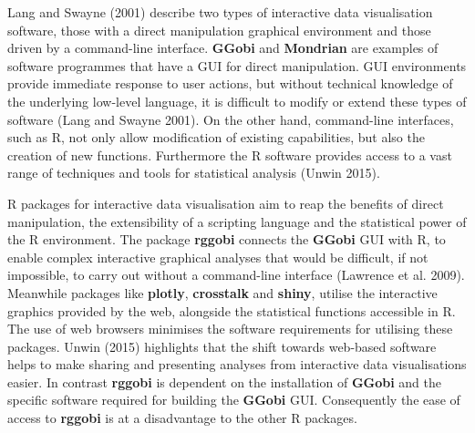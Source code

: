 \documentclass[]{book}
\theoremstyle{definition}
\theoremstyle{definition}
\theoremstyle{definition}
\theoremstyle{remark}
\begin{document}
Lang and Swayne (2001) describe two types of interactive data
visualisation software, those with a direct manipulation graphical
environment and those driven by a command-line interface. \textbf{GGobi}
and \textbf{Mondrian} are examples of software programmes that have a
GUI for direct manipulation. GUI environments provide immediate response
to user actions, but without technical knowledge of the underlying
low-level language, it is difficult to modify or extend these types of
software (Lang and Swayne 2001). On the other hand, command-line
interfaces, such as R, not only allow modification of existing
capabilities, but also the creation of new functions. Furthermore the R
software provides access to a vast range of techniques and tools for
statistical analysis (Unwin 2015).

R packages for interactive data visualisation aim to reap the benefits
of direct manipulation, the extensibility of a scripting language and
the statistical power of the R environment. The package \textbf{rggobi}
connects the \textbf{GGobi} GUI with R, to enable complex interactive
graphical analyses that would be difficult, if not impossible, to carry
out without a command-line interface (Lawrence et al. 2009). Meanwhile
packages like \textbf{plotly}, \textbf{crosstalk} and \textbf{shiny},
utilise the interactive graphics provided by the web, alongside the
statistical functions accessible in R. The use of web browsers minimises
the software requirements for utilising these packages. Unwin (2015)
highlights that the shift towards web-based software helps to make
sharing and presenting analyses from interactive data visualisations
easier. In contrast \textbf{rggobi} is dependent on the installation of
\textbf{GGobi} and the specific software required for building the
\textbf{GGobi} GUI. Consequently the ease of access to \textbf{rggobi}
is at a disadvantage to the other R packages.
\end{document}
